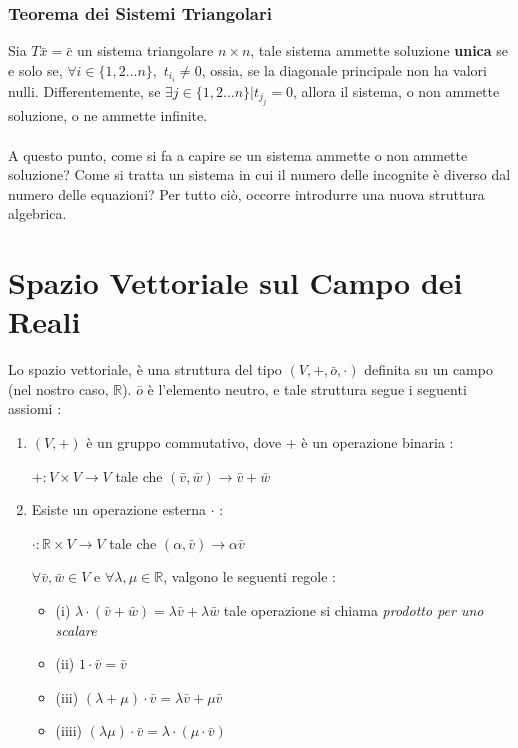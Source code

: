 \documentclass[12pt, letterpaper]{article}
\newcommand{\R}{{\mathbb R}}
\newcommand{\acc}{\\\hphantom{}\\}
\begin{document}
\subsubsection{Teorema dei Sistemi Triangolari}
Sia \(T\bar x = \bar c\) un sistema triangolare \(n\times n\), tale sistema ammette soluzione \textbf{unica}
se e solo se, \(\forall i \in \{1,2\dots n\},\) \(t_{i_i}\ne 0\), ossia, se la diagonale principale non ha 
valori nulli. Differentemente, se \(\exists j \in \{1,2\dots n\}|t_{j_j}=0\), allora il sistema, o non ammette 
soluzione, o ne ammette infinite.\acc 
A questo punto, come si fa a capire se un sistema ammette o non ammette soluzione? Come si tratta un sistema in cui 
il numero delle incognite è diverso dal numero delle equazioni? Per tutto ciò, occorre introdurre una nuova 
struttura algebrica.
\section{Spazio Vettoriale sul Campo dei Reali}
Lo spazio vettoriale, è una struttura del tipo \((V,+,\bar o,\cdot)\) definita su un campo (nel nostro caso, \(\R\)). 
\(\bar o\) è l'elemento neutro, e tale struttura segue i seguenti assiomi : \begin{enumerate}
    \item \((V,+)\) è un gruppo commutativo, dove \(+\) è un operazione binaria : \begin{center}
        \(+:V\times V\rightarrow V\) tale che \((\bar v, \bar w)\rightarrow \bar v +\bar w\)
    \end{center}
    \item Esiste un operazione esterna \(\cdot\) : \begin{center}
        \(\cdot:\R\times V\rightarrow V\) tale che \((\alpha, \bar v)\rightarrow \alpha\bar v \)
    \end{center}  \(\forall \bar v,\bar w \in V\) e \(\forall \lambda,\mu\in\R\), valgono le seguenti regole : \begin{itemize}
        \item (i) \(\lambda\cdot(\bar v+\bar w)=\lambda\bar v+\lambda \bar w\) \hphantom{aa}tale operazione si chiama \textit{prodotto per uno scalare}
        \item (ii) \(1\cdot \bar v=\bar v\)
        \item (iii) \((\lambda+\mu)\cdot\bar v=\lambda\bar v +\mu\bar v\)
        \item (iiii) \((\lambda\mu)\cdot \bar v = \lambda \cdot (\mu\cdot\bar v)\)
    \end{itemize}
\end{enumerate}
\end{document}
